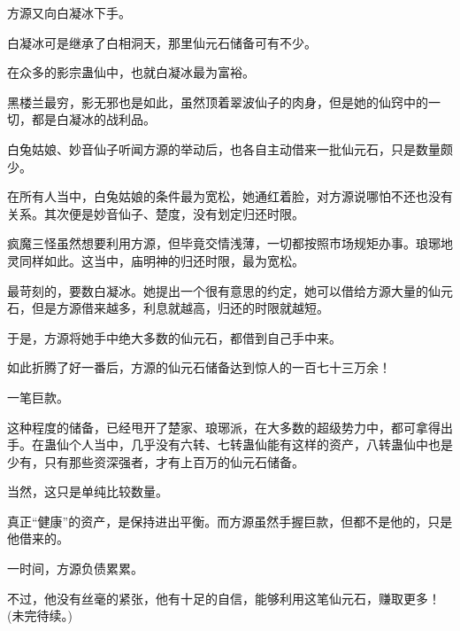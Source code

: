 \begin{this_body}
方源又向白凝冰下手。

白凝冰可是继承了白相洞天，那里仙元石储备可有不少。

在众多的影宗蛊仙中，也就白凝冰最为富裕。

黑楼兰最穷，影无邪也是如此，虽然顶着翠波仙子的肉身，但是她的仙窍中的一切，都是白凝冰的战利品。

白兔姑娘、妙音仙子听闻方源的举动后，也各自主动借来一批仙元石，只是数量颇少。

在所有人当中，白兔姑娘的条件最为宽松，她通红着脸，对方源说哪怕不还也没有关系。其次便是妙音仙子、楚度，没有划定归还时限。

疯魔三怪虽然想要利用方源，但毕竟交情浅薄，一切都按照市场规矩办事。琅琊地灵同样如此。这当中，庙明神的归还时限，最为宽松。

最苛刻的，要数白凝冰。她提出一个很有意思的约定，她可以借给方源大量的仙元石，但是方源借来越多，利息就越高，归还的时限就越短。

于是，方源将她手中绝大多数的仙元石，都借到自己手中来。

如此折腾了好一番后，方源的仙元石储备达到惊人的一百七十三万余！

一笔巨款。

这种程度的储备，已经甩开了楚家、琅琊派，在大多数的超级势力中，都可拿得出手。在蛊仙个人当中，几乎没有六转、七转蛊仙能有这样的资产，八转蛊仙中也是少有，只有那些资深强者，才有上百万的仙元石储备。

当然，这只是单纯比较数量。

真正“健康”的资产，是保持进出平衡。而方源虽然手握巨款，但都不是他的，只是他借来的。

一时间，方源负债累累。

不过，他没有丝毫的紧张，他有十足的自信，能够利用这笔仙元石，赚取更多！(未完待续。)

\end{this_body}

